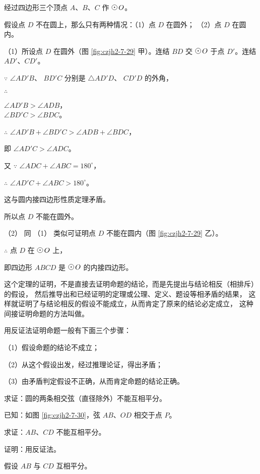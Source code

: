 \begin{enhancedline}
\zhengming 经过四边形三个顶点 $A$、$B$、$C$ 作 $\yuan\,O$。

假设点 $D$ 不在圆上，那么只有两种情况：（1）点 $D$ 在圆外； （2）点 $D$ 在圆内。

（1）所设点 $D$ 在圆外（图 \ref{fig:czjh2-7-29} 甲）。连结 $BD$ 交 $\yuan\,O$ 于点 $D'$。连结 $AD'$、$CD'$。

$\because$ \quad $\angle AD'B$、 $BD'C$ 分别是 $\triangle AD'D$、 $CD'D$ 的外角，

$\therefore$ \quad \begin{zmtblr}[t]{}
    $\angle AD'B > \angle ADB$， \\
    $\angle BD'C > \angle BDC$。
\end{zmtblr}

$\therefore$ \quad $\angle AD'B + \angle BD'C > \angle ADB + \angle BDC$，

即 \quad $\angle AD'C > \angle ADC$。

又 $\because$ \quad $\angle ADC + \angle ABC = 180^\circ$，

$\therefore$ \quad $\angle AD'C + \angle ABC > 180^\circ$。

这与圆内接四边形性质定理矛盾。

所以点 $D$ 不能在圆外。

（2） 同 （1） 类似可证明点 $D$ 不能在圆内（图 \ref{fig:czjh2-7-29} 乙）。

$\therefore$ \quad 点 $D$ 在 $\yuan\,O$ 上，

即四边形 $ABCD$ 是 $\yuan\,O$ 的内接四边形。


这个定理的证明，不是直接去证明命题的结论，而是先提出与结论相反（相排斥）的假设，
然后推导出和已经证明的定理或公理、定义、题设等相矛盾的结果，
这样就证明了与结论相反的假设不能成立，从而肯定了原来的结论必定成立，
这种间接证明命题的方法叫做。

用反证法证明命题一般有下面三个步骤：

（1）假设命题的结论不成立；

（2）从这个假设出发，经过推理论证，得出矛盾；

（3）由矛盾判定假设不正确，从而肯定命题的结论正确。



\liti 求证：圆的两条相交弦（直径除外）不能互相平分。

已知：如图 \ref{fig:czjh2-7-30}，弦 $AB$、$OD$ 相交于点 $P$。

求证：$AB$、$CD$ 不能互相平分。

证明：用反证法。

假设 $AB$ 与 $CD$ 互相平分。


\end{enhancedline}
